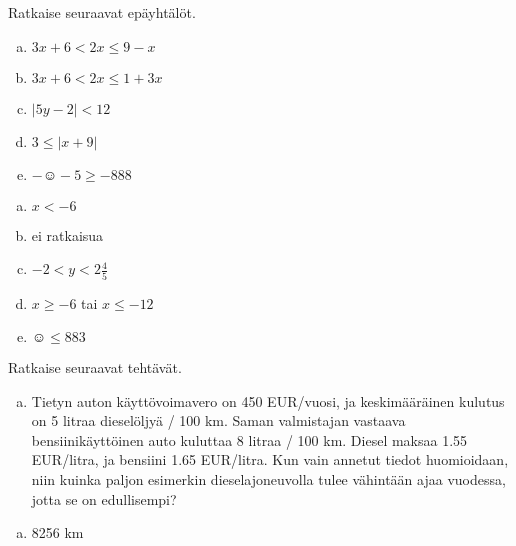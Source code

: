 \begin{tehtava}
    Ratkaise seuraavat epäyhtälöt.
    \begin{enumerate}[a)]
        \item $3x+6<2x\leq 9-x$
        \item $3x+6<2x\leq 1+3x$
        \item $|5y-2|<12$
        \item $3\leq |x+9|$
        \item $-\smiley{}-5\geq-888$
    \end{enumerate}
    \begin{vastaus}
        \begin{enumerate}[a)]
            \item $x<-6$
            \item ei ratkaisua
            \item $-2<y<2\frac{4}{5}$
            \item $x\geq -6$ tai $x\leq -12$
            \item $\smiley{}\leq 883$
        \end{enumerate}
    \end{vastaus}
\end{tehtava}


\begin{tehtava}
    Ratkaise seuraavat tehtävät.
    \begin{enumerate}[a)]
        \item Tietyn auton käyttövoimavero on 450 EUR/vuosi, ja keskimääräinen kulutus on 5 litraa dieselöljyä / 100 km. Saman valmistajan vastaava bensiinikäyttöinen auto kuluttaa 8 litraa / 100 km. Diesel maksaa 1.55 EUR/litra, ja bensiini 1.65 EUR/litra. Kun vain annetut tiedot huomioidaan, niin kuinka paljon esimerkin dieselajoneuvolla tulee vähintään ajaa vuodessa, jotta se on edullisempi?
    \end{enumerate}

    \begin{vastaus}
        \begin{enumerate}[a)]
            \item 8256 km
        \end{enumerate}
    \end{vastaus}
\end{tehtava}